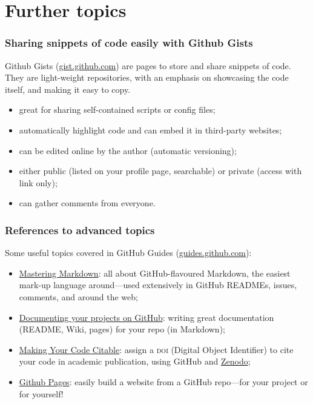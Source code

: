 \documentclass[10pt,svgnames]{beamer}
\begin{document}
\section{Further topics}
\begin{frame}
\frametitle{Sharing snippets of code easily with Github Gists}
Github Gists (\href{https://gist.github.com/}{gist.github.com}) are pages to store and share snippets of code. They are light-weight repositories, with an emphasis on showcasing the code itself, and making it easy to copy.\\
\pause
\begin{itemize}
  \item great for sharing self-contained scripts or config files;
  \item automatically highlight code and can embed it in third-party websites;
  \item can be edited online by the author (automatic versioning);
  \item either public (listed on your profile page, searchable) or private (access with link only);
  \item can gather comments from everyone.
\end{itemize}
\end{frame}
\begin{frame}


\frametitle{References to advanced topics}
Some useful topics covered in GitHub Guides (\href{https://guides.github.com/}{guides.github.com}):
\begin{itemize}
  \item \href{https://guides.github.com/features/mastering-markdown/}{Mastering Markdown}: all about GitHub-flavoured Markdown, the easiest mark-up language around—used extensively in GitHub READMEs, issues, comments, and around the web;
  \item \href{https://guides.github.com/features/wikis/}{Documenting your projects on GitHub}: writing great documentation (README, Wiki, pages) for your repo (in Markdown);
  \item \href{https://guides.github.com/activities/citable-code/}{
Making Your Code Citable}: assign a \textsc{doi} (Digital Object Identifier) to cite your code in academic publication, using GitHub and \href{https://zenodo.org/}{Zenodo};
  \item \href{https://guides.github.com/features/pages/}{Github Pages}: easily build a website from a GitHub repo—for your project or for yourself!
\end{itemize}
\end{frame}
\end{document}
